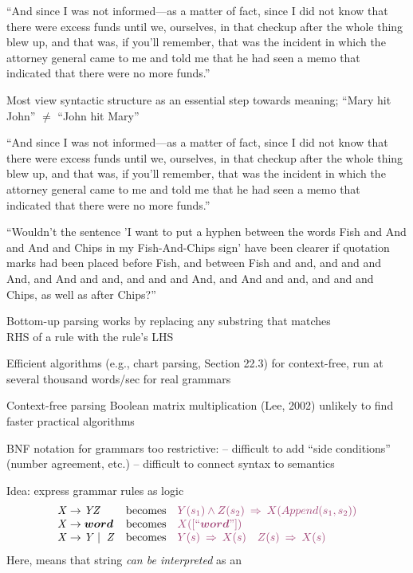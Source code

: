 \documentclass{article}
\begin{document}
\begin{huge}
``And since I was not informed---as a matter of fact, since I did not
know that there were excess funds until we, ourselves, in that checkup
after the whole thing blew up, and that was, if you'll remember, that
was the incident in which the attorney general came to me and told me
that he had seen a memo that indicated that there were no more
funds.''


Most view syntactic structure as an essential step towards meaning;\al
``Mary hit John'' $\neq$ ``John hit Mary''

``And since I was not informed---as a matter of fact, since I did not
know that there were excess funds until we, ourselves, in that checkup
after the whole thing blew up, and that was, if you'll remember, that
was the incident in which the attorney general came to me and told me
that he had seen a memo that indicated that there were no more
funds.''

``Wouldn't the sentence 'I want to put a hyphen between the words Fish
and And and And and Chips in my Fish-And-Chips sign' have been clearer
if quotation marks had been placed before Fish, and between Fish and
and, and and and And, and And and and, and and and And, and And and
and, and and and Chips, as well as after Chips?''



Bottom-up parsing works by replacing any substring that matches\\
RHS of a rule with the rule's LHS

Efficient algorithms (e.g., chart parsing, Section 22.3)  for context-free,
run at several thousand words/sec for real grammars

Context-free parsing \mat{$\equiv$} Boolean matrix multiplication (Lee, 2002)\nl
\mat{$\implies$} unlikely to find faster practical algorithms 



BNF notation for grammars too restrictive:\al
-- difficult to add ``side conditions'' (number agreement, etc.)\al
-- difficult to connect syntax to semantics

Idea: express grammar rules as logic
\[\begin{array}{lcl}
\bnf{X}\bnfeq\bnf{Y}\bnf{Z}        &\mbox{becomes} & \mat{Y(s_1) \land Z(s_2) \implies X(Append(s_1,s_2))} \\
\bnf{X}\bnfeq\bnft{word}           &\mbox{becomes} & \mat{X([\mbox{``}\bnft{word}\mbox{''}])} \\
\bnf{X}\bnfeq\bnf{Y}\bnfor \bnf{Z} &\mbox{becomes} & \mat{Y(s) \implies X(s)\quad Z(s) \implies X(s)}
\end{array}\]
Here,  means that string  \emph{can be interpreted} as an 


\end{huge}
\end{document}
